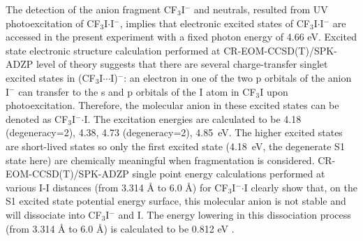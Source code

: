 \documentclass[%
aip,
rsi,
 amsmath,amssymb,
reprint,%
]{revtex4-1}
\begin{document}
The detection of the anion fragment CF$_3$I$^-$ and neutrals, resulted from UV photoexcitation of CF$_3$I$\cdot$I$^-$, implies that electronic excited states of CF$_3$I$\cdot$I$^-$ are accessed in the present experiment with a fixed photon energy of 4.66 eV. Excited state electronic structure calculation performed at CR-EOM-CCSD(T)/SPK-ADZP level of theory suggests that there are several charge-transfer singlet excited states in (CF$_3$I$\cdots$I)$^-$: an electron in one of the two p orbitals of the anion I$^-$ can transfer to the s and p orbitals of the I atom in CF$_3$I upon photoexcitation. Therefore, the molecular anion in these excited states can be denoted as CF$_3$I$^-$$\cdot$I. The excitation energies are calculated to be 4.18 (degeneracy=2), 4.38, 4.73 (degeneracy=2), 4.85~eV. The higher excited states are short-lived states so only the first excited state (4.18~eV, the degenerate S1 state here) are chemically meaningful when fragmentation is considered. CR-EOM-CCSD(T)/SPK-ADZP single point energy calculations performed at various I-I distances (from 3.314 Å to 6.0 Å) for CF$_3$I$^-$$\cdot$I clearly show that, on the S1 excited state potential energy surface, this molecular anion is not stable and will dissociate into CF$_3$I$^-$ and I. The energy lowering in this dissociation process (from 3.314 Å to 6.0 Å) is calculated to be 0.812 eV . 
\end{document}
